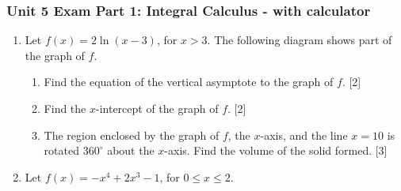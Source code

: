 \documentclass[12pt, twoside]{article}
\begin{document}
\subsubsection*{Unit 5 Exam Part 1: Integral Calculus - with calculator}
 \begin{enumerate}

\subsubsection*{You may use a calculator on these problems \hfill [34 marks]}


\item Let $f(x)=2\ln(x-3)$, for $x>3$. The following diagram shows part of the graph of $f$.
    \begin{center}
    \end{center}
  \begin{enumerate}
    \item Find the equation of the vertical asymptote to the graph of $f$. \hfill [2]
    \item Find the $x$-intercept of the graph of $f$. \hfill [2]
    \item The region enclosed by the graph of $f$, the $x$-axis, and the line $x=10$ is rotated $360^\circ$ about the $x$-axis. Find the volume of the solid formed.  \hfill [3]
  \end{enumerate}

\item Let $f(x)=-x^4+2x^3-1$, for $0 \leq x \leq 2$.


\end{enumerate}
\end{document}
